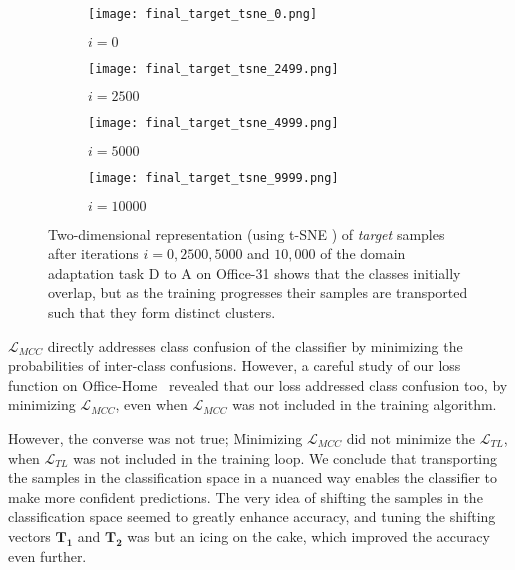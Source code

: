 \documentclass[10pt,twocolumn,letterpaper]{article}
\begin{document}
\begin{figure*}
     \centering
     \begin{subfigure}[b]{0.22\textwidth}
         \centering
         \texttt{[image: final\_target\_tsne\_0.png]}
         \caption{$i = 0$}
         \label{fig:iter0}
     \end{subfigure}
     \hspace{1em}
     \begin{subfigure}[b]{0.22\textwidth}
         \centering
         \texttt{[image: final\_target\_tsne\_2499.png]}
         \caption{$i = 2500$}
         \label{fig:iter2500}
     \end{subfigure}
     \hspace{1em}
     \begin{subfigure}[b]{0.22\textwidth}
         \centering
         \texttt{[image: final\_target\_tsne\_4999.png]}
         \caption{$i = 5000$}
         \label{fig:iter5000}
     \end{subfigure}
     \hspace{1em}
     \begin{subfigure}[b]{0.22\textwidth}
         \centering
         \texttt{[image: final\_target\_tsne\_9999.png]}
         \caption{$i = 10000$}
         \label{fig:iter10000}
     \end{subfigure}
        \caption{Two-dimensional representation (using t-SNE \cite{tsne}) of \emph{target} samples after iterations $i = 0,2500,5000$ and $10,000$ of the domain adaptation task D to A on Office-31 shows that the classes initially overlap, but as the training progresses their samples are transported such that they form distinct clusters.}
        \label{fig:tsne}
\end{figure*}

$\mathcal{L}_{MCC}$ directly addresses class confusion of the classifier by minimizing the probabilities of inter-class confusions. However, a careful study of our loss function on Office-Home~\cite{office-home} revealed that our loss addressed class confusion too, by minimizing $\mathcal{L}_{MCC}$, even when $\mathcal{L}_{MCC}$ was not included in the training algorithm.

However, the converse was not true; Minimizing $\mathcal{L}_{MCC}$ did not minimize the $\mathcal{L}_{TL}$, when $\mathcal{L}_{TL}$ was not included in the training loop. We conclude that transporting the samples in the classification space in a nuanced way enables the classifier to make more confident predictions. The very idea of shifting the samples in the classification space seemed to greatly enhance accuracy, and tuning the shifting vectors $\mathbf{T_1}$ and $\mathbf{T_2}$ was but an icing on the cake, which improved the accuracy even further. 
\end{document}
